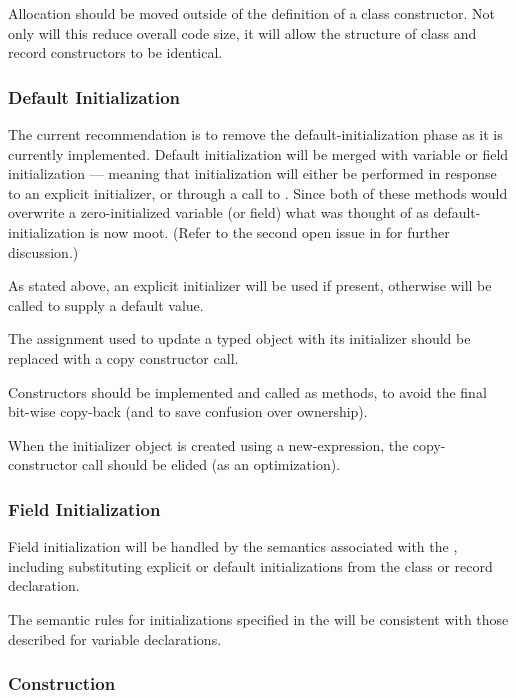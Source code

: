 Allocation should be moved outside of the definition of a class constructor.  Not only
will this reduce overall code size, it will allow the structure of class and record
constructors to be identical.

\subsubsection{Default Initialization}

The current recommendation is to remove the default-initialization phase as it is
currently implemented.  Default initialization will be merged with variable or field
initialization --- meaning that initialization will either be performed in response to
an explicit initializer, or through a call to .  Since both of these
methods would overwrite a zero-initialized variable (or field) what was thought of as
default-initialization is now moot.  (Refer to the second open issue in
 for further discussion.)

As stated above, an explicit initializer will be used if present, otherwise
 will be called to supply a default value.

The assignment used to update a typed object with its initializer should be replaced with
a copy constructor call.

Constructors should be implemented and called as methods, to avoid the final bit-wise
copy-back (and to save confusion over ownership).

When the initializer object is created using a new-expression, the copy-constructor call
should be elided (as an optimization).

\subsubsection{Field Initialization}

Field initialization will be handled by the semantics associated with the
, including substituting explicit or default initializations from
the class or record declaration.

The semantic rules for initializations specified in the  will be
consistent with those described for variable declarations.

\subsubsection{Construction}

